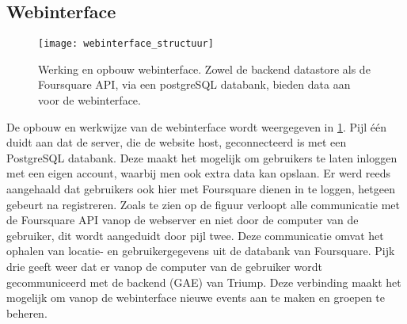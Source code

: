 \subsection{Webinterface}
\begin{figure}[H]
	\centering
	\texttt{[image: webinterface\_structuur]}
	\caption{Werking en opbouw webinterface. Zowel de backend datastore als de Foursquare API, via een postgreSQL databank, bieden data aan voor de webinterface. }
	\label{fig:Webinterface}
\end{figure}
De opbouw en werkwijze van de webinterface wordt weergegeven in \ref{fig:Webinterface}. Pijl één duidt aan dat de server, die de website host, geconnecteerd is met een PostgreSQL databank. Deze maakt het mogelijk om gebruikers te laten inloggen met een eigen account, waarbij men ook extra data kan opslaan. Er werd reeds aangehaald dat gebruikers ook hier met Foursquare dienen in te loggen, hetgeen gebeurt na registreren. Zoals te zien op de figuur verloopt alle communicatie met de Foursquare API vanop de webserver en niet door de computer van de gebruiker, dit wordt aangeduidt door pijl twee. Deze communicatie omvat het ophalen van locatie- en gebruikergegevens uit de databank van Foursquare.
Pijk drie geeft weer dat er vanop de computer van de gebruiker wordt gecommuniceerd met de backend (GAE) van Triump. Deze verbinding maakt het mogelijk om vanop de webinterface nieuwe events aan te maken en groepen te beheren.


